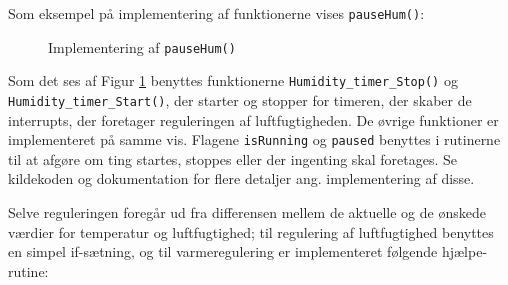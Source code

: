 Som eksempel på implementering af funktionerne vises \texttt{pauseHum()}:

\begin{figure}[H]
\centering
{}
\caption[Diagram]{Implementering af \texttt{pauseHum()}}
\label{fig:PauseHum}
\end{figure}

Som det ses af Figur \ref{fig:PauseHum} benyttes funktionerne \texttt{Humidity\_timer\_Stop()} og \newline \texttt{Humidity\_timer\_Start()}, der starter og stopper for timeren, der skaber de interrupts, der foretager reguleringen af luftfugtigheden. De øvrige funktioner er implementeret på samme vis. Flagene \texttt{isRunning} og \texttt{paused} benyttes i rutinerne til at afgøre om ting startes, stoppes eller der ingenting skal foretages. Se kildekoden og dokumentation for flere detaljer ang. implementering af disse.

Selve reguleringen foregår ud fra differensen mellem de aktuelle og de ønskede værdier for temperatur og luftfugtighed; til regulering af luftfugtighed benyttes en simpel if-sætning, og til varmeregulering er implementeret følgende hjælpe-rutine:


